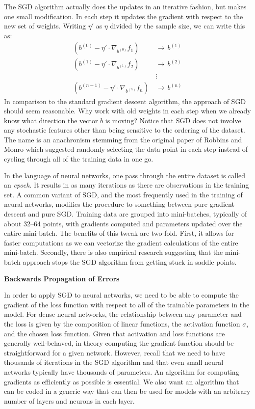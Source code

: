 \documentclass[12pt,hidelinks]{article}
\numberwithin{equation}{section}
\begin{document}
The SGD algorithm actually does the updates in an iterative fashion, but
makes one small modification. In each step it updates the gradient with respect
to the new set of weights. Writing $\eta'$ as $\eta$ divided by the sample size,
we can write this as:
\begin{align}
\left( b^{(0)} - \eta' \cdot \nabla_{b^{(0)}} f_1 \right) \, &\rightarrow \, b^{(1)} \\
\left( b^{(1)} - \eta' \cdot \nabla_{b^{(1)}} f_2 \right) \, &\rightarrow \, b^{(2)} \\
&\vdots \\
\left( b^{(n-1)} - \eta' \cdot \nabla_{b^{(n)}} f_n \right) \, &\rightarrow \, b^{(n)}
\end{align}
In comparison to the standard gradient descent algorithm, the approach of SGD
should seem reasonable. Why work with old weights in each step when we already
know what direction the vector $b$ is moving? Notice that SGD does not involve
any stochastic features other than being sensitive to the ordering of the
dataset. The name is an anachronism stemming from the original paper of
Robbins and Monro which suggested randomly selecting the data point in each
step instead of cycling through all of the training data in one go.

In the language of neural networks, one pass through the entire dataset is
called an \textit{epoch}. It results in as many iterations as there are
observations in the training set. A common variant of SGD, and the most
frequently used in the training of neural networks, modifies the procedure
to something between pure gradient descent and pure SGD. Training
data are grouped into mini-batches, typically of about 32--64 points, with
gradients computed and parameters updated over the entire mini-batch. The
benefits of this tweak are two-fold. First, it allows for faster computations
as we can vectorize the gradient calculations of the entire mini-batch.
Secondly, there is also empirical research suggesting that the
mini-batch approach stops the SGD algorithm from getting stuck in saddle
points.

\textbf{Backwards Propagation of Errors}

In order to apply SGD to neural networks, we need to be able to
compute the gradient of the loss function with respect to all of
the trainable parameters in the model. For dense neural networks,
the relationship between any parameter and the loss is given by
the composition of linear functions, the activation function $\sigma$,
and the chosen loss function. Given that activation and loss functions
are generally well-behaved, in theory computing the gradient function
should be straightforward for a given network. However, recall that
we need to have thousands of iterations in the SGD algorithm and that
even small neural networks typically have thousands of parameters.
An algorithm for computing gradients as efficiently as possible is
essential. We also want an algorithm that can be coded in a
generic way that can then be used for models with an arbitrary
number of layers and neurons in each layer.
\end{document}
